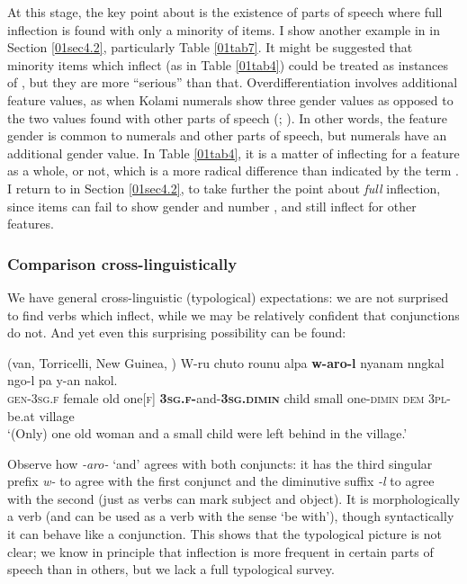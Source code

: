 \documentclass[output=paper,colorlinks,citecolor=brown]{langscibook}
\begin{document}
At this stage, the key point about  is the existence of parts of speech where full inflection is found with only a minority of items. I show another example in  in Section \ref{01sec4.2}, particularly Table \ref{01tab7}. It might be suggested that minority items which inflect (as in Table \ref{01tab4}) could be treated as instances of , but they are more ``serious'' than that. Overdifferentiation involves additional feature values, as when Kolami numerals show three gender values as opposed to the two values found with other parts of speech (\citealt[56]{emeneau1955}; \citealt[168]{corbett1991}). In other words, the feature gender is common to numerals and other parts of speech, but numerals have an additional gender value. In Table \ref{01tab4}, it is a matter of inflecting for a feature as a whole, or not, which is a more radical difference than indicated by the term . I return to  in Section \ref{01sec4.2}, to take further the point about \textit{full} inflection, since items can fail to show gender and number , and still inflect for other features.

\newpage

\subsubsection{Comparison cross-linguistically} \label{01sec3.1.3}

We have general cross-linguistic (typological) expectations: we are not surprised to find verbs which inflect, while we may be relatively confident that conjunctions do not. And yet even this surprising possibility can be found:

\begin{exe}
	\ex {} (van, Torricelli, New Guinea, \citealt[534]{browndryer2008}) \label{01ex6}
	\gll W-ru chuto rounu alpa \textbf{w-aro-l} nyanam nngkal ngo-l pa y-an nakol. \\
	\textsc{gen-3sg.f} female old one\textsc{[f]} \textbf{\textsc{3sg.f-}}and-\textbf{\textsc{3sg.dimin}}	child small	one-\textsc{dimin} \textsc{dem} \textsc{3pl}-be.at	village \\
	\trans ‘(Only) one old woman and a small child were left behind in the village.’
\end{exe}

Observe how \textit{-aro-} `and' agrees with both conjuncts: it has the third singular prefix \textit{w-} to agree with the first conjunct and the diminutive suffix \textit{-l} to agree with the second (just as  verbs can mark subject and object). It is morphologically a verb (and can be used as a verb with the sense `be with'), though syntactically it can behave like a conjunction. This shows that the typological picture is not clear; we know in principle that inflection is more frequent in certain parts of speech than in others, but we lack a full typological survey.
\end{document}
